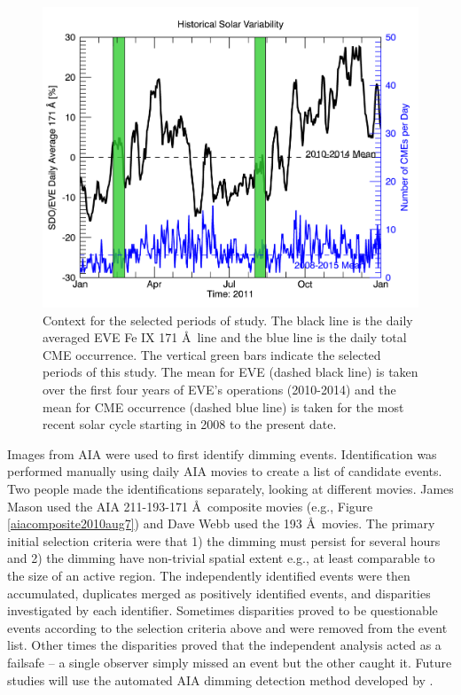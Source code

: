 \begin{figure}[!h]
    \begin{center}
	    \includegraphics[width=150mm]{Images/FourWeekContext.png}
    \end{center}
    \caption[Selected four week period in historical context]{
        Context for the selected periods of study. The black line is the daily averaged EVE Fe IX 171 \AA\ line and the 
        blue line is the daily total CME occurrence. The vertical green bars indicate the selected periods of this study.
        The mean for EVE (dashed black line) is taken over the first four years of EVE's operations (2010-2014) and the 
        mean for CME occurrence (dashed blue line) is taken for the most recent solar cycle starting in 2008 to the present 
        date.
	}
    \label{fig:historicalcontext}
\end{figure}
 
Images from AIA were used to first identify dimming events. Identification was performed manually using daily AIA movies to create a list of candidate events. Two people made the identifications separately, looking at different movies. James Mason used the AIA 211-193-171 \AA\ composite movies (e.g., Figure \ref{aiacomposite2010aug7}) and Dave Webb used the 193 \AA\ movies. The primary initial selection criteria were that 1) the dimming must persist for several hours and 2) the dimming have non-trivial spatial extent e.g., at least comparable to the size of an active region. The independently identified events were then accumulated, duplicates merged as positively identified events, and disparities investigated by each identifier. Sometimes disparities proved to be questionable events according to the selection criteria above and were removed from the event list. Other times the disparities proved that the independent analysis acted as a failsafe -- a single observer simply missed an event but the other caught it. Future studies will use the automated AIA dimming detection method developed by \citet{Krista2013a}. 
 
